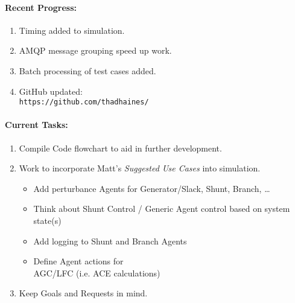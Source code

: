 \documentclass[12pt]{article}
\begin{document}
\begin{multicols}{2}
\raggedright
	\paragraph{Recent Progress:}
	\begin{enumerate}

		\item Timing added to simulation.

		\item AMQP message grouping speed up work.

		\item Batch processing of test cases added.
		

		\item GitHub updated:\\
		\verb|https://github.com/thadhaines/|
		
	\end{enumerate}
\paragraph{Current Tasks:}
	\begin{enumerate}

		\item Compile Code flowchart to aid in further development.

		\item Work to incorporate Matt's \emph{Suggested Use Cases} into simulation.
		\begin{itemize}
		\item Add perturbance Agents for Generator/Slack, Shunt, Branch, \ldots
		\item Think about Shunt Control / Generic Agent control based on system state(s)
		\item Add logging to Shunt and Branch Agents
		
		\item Define Agent actions for \\ AGC/LFC (i.e. ACE calculations)
		
		\end{itemize}
		\item Keep Goals and Requests in mind.
		


\end{enumerate}
\end{multicols}
\end{document}

